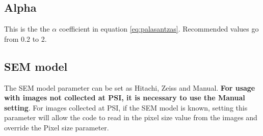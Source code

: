 \documentclass[12pt, a4paper, openany]{report}
\begin{document}
\subsection{Alpha}
This is the the $\alpha$ coefficient in equation \ref{eq:palasantzas}. Recommended values go from 0.2 to 2.
\subsection{SEM model}
The SEM model parameter can be set as Hitachi, Zeiss and Manual. \textbf{For usage with images not collected at PSI, it is necessary to use the Manual setting}. For images collected at PSI, if the SEM model is known, setting this parameter will allow the code to read in the pixel size value from the images and override the Pixel size parameter.


\end{document}
